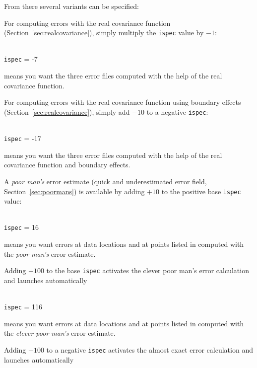 From there several variants can be specified:

For computing errors with the real covariance function (Section~\ref{sec:realcovariance}), simply multiply the \texttt{ispec} value by $-1$:

\example\\
\texttt{ispec}             = -7 \qquad \begin{minipage}[t]{.7\textwidth}{means you want the three error files computed with the help of the real covariance function.}\end{minipage}


For computing errors with the real covariance function using boundary effects (Section~\ref{sec:realcovariance}), simply add $-10$ to a negative \texttt{ispec}:

\example\\
\texttt{ispec}             = -17 \qquad \begin{minipage}[t]{.7\textwidth}{means you want the three error files computed with the help of the real covariance function and boundary effects.}\end{minipage}


A \textit{poor man's} error estimate (quick and underestimated error field, Section~\ref{sec:poormans}) is available by adding $+10$ to the positive base \texttt{ispec} value:

\example\\
\texttt{ispec}             = 16 \qquad \begin{minipage}[t]{.7\textwidth}{means you want errors at data locations and at points listed in  computed with the \textit{poor man's} error estimate.}\end{minipage}



Adding $+100$ to the base \texttt{ispec} activates  the clever poor man's error calculation and launches automatically 

\example\\
\texttt{ispec}             = 116 \qquad \begin{minipage}[t]{.7\textwidth}{means you want errors at data locations and at points listed in  computed with the \textit{clever poor man's} error estimate.}\end{minipage}

Adding $-100$ to a negative \texttt{ispec} activates the almost exact error calculation and launches automatically 

